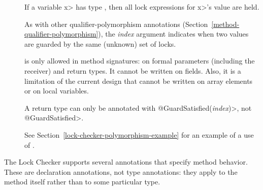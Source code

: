 \begin{description}

\item[]
  If a variable \<x> has type , then all
  lock expressions for \<x>'s value are held.

  As with other qualifier-polymorphism annotations
  (Section~\ref{method-qualifier-polymorphism}), the \emph{index} argument
  indicates when two values are guarded by the same (unknown) set of locks.

   is only allowed in method signatures:  on
  formal parameters (including the receiver) and return types.
  It cannot be written on fields.  Also, it is a limitation of the
  current design that  cannot be written on
  array elements or on local variables.

  A return type can only be annotated with \<@GuardSatisfied(\emph{index})>,
  not \<@GuardSatisfied>.

  See Section~\ref{lock-checker-polymorphism-example}
  for an example of a use of .


\end{description}



The Lock Checker supports several annotations that specify method behavior.
These are declaration annotations, not type annotations: they apply to the
method itself rather than to some particular type.


